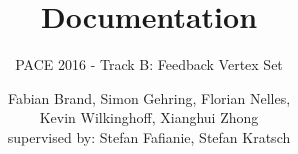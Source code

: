 \documentclass[11pt,a4paper]{scrartcl}
\begin{document}
\title{Documentation}
\subtitle{PACE 2016 - Track B: Feedback Vertex Set}
\author{Fabian Brand, Simon Gehring, Florian Nelles,\\ Kevin Wilkinghoff, Xianghui Zhong\\
	supervised by: Stefan Fafianie, Stefan Kratsch}
\maketitle

\nocite{bafna1999}
\nocite{chen2008}


\end{document}
